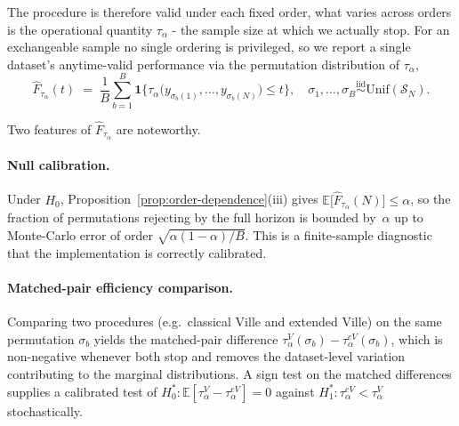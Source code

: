\documentclass{article}%
\newcommand{\1}{\mathbf{1}}
\begin{document}
The procedure is therefore valid under each fixed order, what varies across orders is the operational quantity $\tau_{\alpha}$ - the sample size at which we actually stop. For an exchangeable sample no single ordering is privileged, so we report a single dataset's anytime-valid performance via the permutation distribution of $\tau_{\alpha}$,
\begin{equation}\label{eq:perm-cdf}
   \widehat{F}_{\tau_{\alpha}}(t) \;=\; \frac{1}{B}\sum_{b=1}^{B}\mathbf{1}\bigl\{\tau_{\alpha}\bigl(y_{\sigma_{b}(1)},\ldots,y_{\sigma_{b}(N)}\bigr)\le t\bigr\}, \quad \sigma_{1},\ldots,\sigma_{B}\stackrel{\mathrm{iid}}{\sim}\mathrm{Unif}(\mathcal{S}_{N}).
\end{equation}

Two features of $\widehat{F}_{\tau_{\alpha}}$ are noteworthy.

\paragraph{Null calibration.} Under $H_{0}$, Proposition~\ref{prop:order-dependence}(iii) gives $\mathbb{E}\bigl[\widehat{F}_{\tau_{\alpha}}(N)\bigr]\le\alpha$, so the fraction of permutations rejecting by the full horizon is bounded by~$\alpha$ up to Monte-Carlo error of order $\sqrt{\alpha(1-\alpha)/B}$. This is a finite-sample diagnostic that the implementation is correctly calibrated.

\paragraph{Matched-pair efficiency comparison.} Comparing two procedures (e.g.\ classical Ville and extended Ville) on the same permutation $\sigma_{b}$ yields the matched-pair difference $\tau_{\alpha}^{V}(\sigma_{b})-\tau_{\alpha}^{eV}(\sigma_{b})$, which is non-negative whenever both stop and removes the dataset-level variation contributing to the marginal distributions. A sign test on the matched differences supplies a calibrated test of $H_{0}^{*}\colon\mathbb{E}[\tau_{\alpha}^{V}-\tau_{\alpha}^{eV}]=0$ against $H_{1}^{*}\colon\tau_{\alpha}^{eV}<\tau_{\alpha}^{V}$ stochastically.

\end{document}
